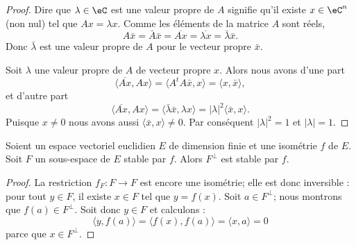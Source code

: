 \begin{proof}
	Dire que \( \lambda\in \eC\) est une valeur propre de \( A\) signifie qu'il existe \( x\in \eC^n\) (non nul) tel que \( Ax=\lambda x\). Comme les éléments de la matrice \( A\) sont réels,
	\begin{equation}
		A\bar x=\bar A\bar x=\overline{ Ax }=\overline{ \lambda x }=\bar \lambda\bar x.
	\end{equation}
	Donc \( \bar \lambda\) est une valeur propre de \( A\) pour le vecteur propre \( \bar x\).

	Soit \( \lambda\)  une valeur propre de \( A\) de vecteur propre \( x\). Alors nous avons d'une part
	\begin{equation}
		\langle \overline{ Ax }, Ax\rangle =\langle A^tA\bar x, x\rangle =\langle x, \bar x\rangle ,
	\end{equation}
	et d'autre part
	\begin{equation}
		\langle \overline{ Ax }, Ax\rangle =\langle \bar \lambda \bar x, \lambda x\rangle =| \lambda |^2\langle \bar x, x\rangle .
	\end{equation}
	Puisque \( x\neq 0\) nous avons aussi \( \langle \bar x, x\rangle \neq 0\). Par conséquent \( | \lambda |^2=1\) et \( | \lambda |=1\).
\end{proof}

\begin{lemma}        \label{LEMooNEDQooNRmASH}
	Soient un espace vectoriel euclidien \( E\) de dimension finie et une isométrie \( f\) de \( E\). Soit \( F\) un sous-espace de \( E\) stable par \( f\). Alors \( F^{\perp}\) est stable par \( f\).
\end{lemma}

\begin{proof}
	La restriction \( f_F\colon F\to F\) est encore une isométrie; elle est donc inversible : pour tout $y\in F$, il existe \( x\in F\) tel que \( y=f(x)\). Soit \( a\in F^{\perp}\); nous montrons que \( f(a)\in F^{\perp}\). Soit donc \( y\in F\) et calculons :
	\begin{equation}
		\langle y, f(a)\rangle =\langle f(x), f(a)\rangle =\langle x,a \rangle =0
	\end{equation}
	parce que \( x\in F^{\perp}\).
\end{proof}

